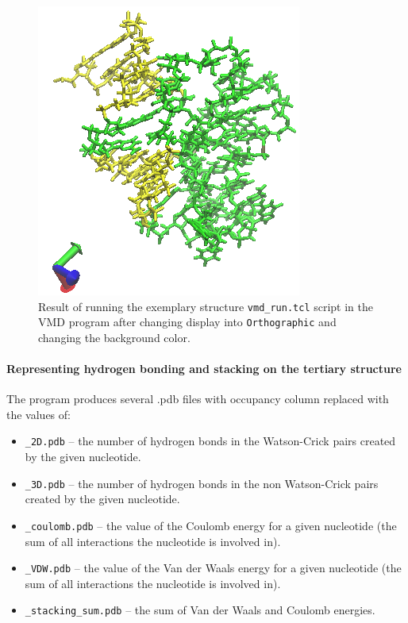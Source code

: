 \documentclass[12pt]{article}
\begin{document}
\begin{figure}[h!]
\centering
\includegraphics[scale=0.8]{./pictures/motifs_vmd.png}
\caption{Result of running the exemplary structure \texttt{vmd\_run.tcl} script in the VMD program after changing display into \texttt{Orthographic} and changing the background color. }
\end{figure}

\paragraph{Representing hydrogen bonding and stacking on the tertiary structure} The program produces several .pdb files with occupancy column replaced with the values of:
\begin{itemize}
\item \texttt{\_2D.pdb} -- the number of hydrogen bonds in the Watson-Crick pairs created by the given nucleotide.
\item \texttt{\_3D.pdb} -- the number of hydrogen bonds in the non Watson-Crick pairs created by the given nucleotide.
\item \texttt{\_coulomb.pdb} -- the value of the Coulomb energy for a given nucleotide  (the sum of all interactions the nucleotide is involved in).
\item \texttt{\_VDW.pdb} -- the value of the Van der Waals energy for a given nucleotide (the sum of all interactions the nucleotide is involved in).
\item \texttt{\_stacking\_sum.pdb} -- the sum of Van der Waals and Coulomb energies. 
\end{itemize}
\end{document}

